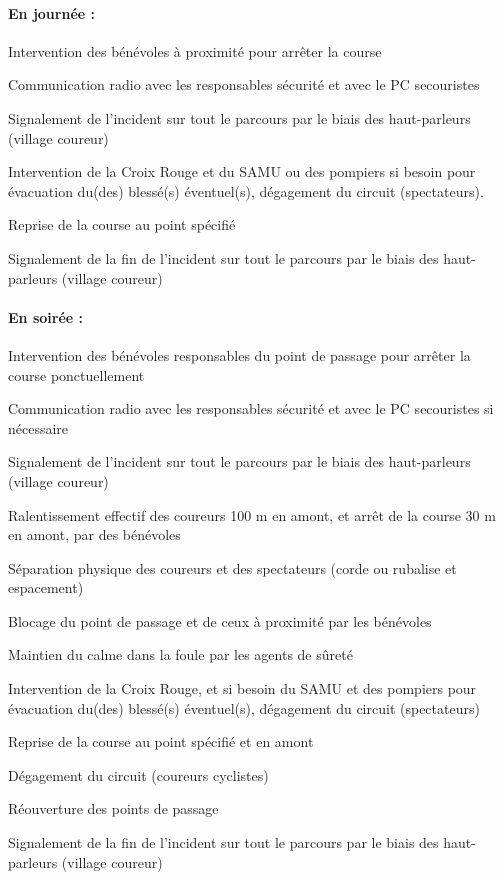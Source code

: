 \documentclass[hidelinks, paper=a4, fontsize=13pt]{report}
\begin{document}
\paragraph{En journée :}
\begin{list}{•}{}
\item Intervention des bénévoles à proximité pour arrêter la course
\item Communication radio avec les responsables sécurité et avec le PC secouristes 
\item Signalement de l’incident sur tout le parcours par le biais des haut-parleurs (village coureur)
\item Intervention de la Croix Rouge et du SAMU ou des pompiers si besoin pour évacuation du(des) blessé(s) éventuel(s), dégagement du circuit (spectateurs).
\item Reprise de la course au point spécifié
\item Signalement de la fin de l’incident sur tout le parcours par le biais des haut-parleurs (village coureur)
\end{list}


\paragraph{En soirée :}
\begin{list}{•}{}
\item Intervention des bénévoles responsables du point de passage pour arrêter la course ponctuellement 
\item Communication radio avec les responsables sécurité et avec le PC secouristes si nécessaire
\item Signalement de l’incident sur tout le parcours par le biais des haut-parleurs (village coureur)
\item Ralentissement effectif des coureurs 100 m en amont, et arrêt de la course  30 m en amont, par des bénévoles
\item Séparation physique des coureurs et des spectateurs (corde ou rubalise et espacement)
\item Blocage du point de passage et de ceux à proximité par les bénévoles
\item Maintien du calme dans la foule par les agents de sûreté
\item Intervention de la Croix Rouge, et si besoin du SAMU et des pompiers pour évacuation du(des) blessé(s) éventuel(s), dégagement du circuit (spectateurs)
\item Reprise de la course au point spécifié et en amont
\item Dégagement du circuit (coureurs cyclistes)
\item Réouverture des points de passage
\item Signalement de la fin de l’incident sur tout le parcours par le biais des haut-parleurs (village coureur)
\end{list}
\newpage
\end{document}

